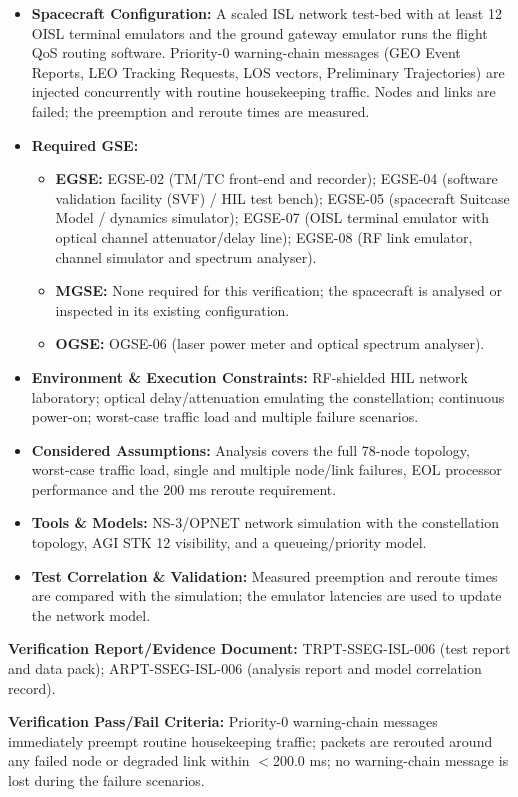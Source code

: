 \begin{itemize}
\item \textbf{Spacecraft Configuration:} A scaled ISL network test-bed with at least 12 OISL terminal emulators and the ground gateway emulator runs the flight QoS routing software. Priority-0 warning-chain messages (GEO Event Reports, LEO Tracking Requests, LOS vectors, Preliminary Trajectories) are injected concurrently with routine housekeeping traffic. Nodes and links are failed; the preemption and reroute times are measured.
\item \textbf{Required GSE:}
\begin{itemize}
\item \textbf{EGSE:} EGSE-02 (TM/TC front-end and recorder); EGSE-04 (software validation facility (SVF) / HIL test bench); EGSE-05 (spacecraft Suitcase Model / dynamics simulator); EGSE-07 (OISL terminal emulator with optical channel attenuator/delay line); EGSE-08 (RF link emulator, channel simulator and spectrum analyser).
\item \textbf{MGSE:} None required for this verification; the spacecraft is analysed or inspected in its existing configuration.
\item \textbf{OGSE:} OGSE-06 (laser power meter and optical spectrum analyser).
\end{itemize}
\item \textbf{Environment \& Execution Constraints:} RF-shielded HIL network laboratory; optical delay/attenuation emulating the constellation; continuous power-on; worst-case traffic load and multiple failure scenarios.
\item \textbf{Considered Assumptions:} Analysis covers the full 78-node topology, worst-case traffic load, single and multiple node/link failures, EOL processor performance and the 200 ms reroute requirement.
\item \textbf{Tools \& Models:} NS-3/OPNET network simulation with the constellation topology, AGI STK 12 visibility, and a queueing/priority model.
\item \textbf{Test Correlation \& Validation:} Measured preemption and reroute times are compared with the simulation; the emulator latencies are used to update the network model.
\end{itemize}
\par\textbf{Verification Report/Evidence Document:} TRPT-SSEG-ISL-006 (test report and data pack); ARPT-SSEG-ISL-006 (analysis report and model correlation record).
\par\textbf{Verification Pass/Fail Criteria:} Priority-0 warning-chain messages immediately preempt routine housekeeping traffic; packets are rerouted around any failed node or degraded link within $<$200.0 ms; no warning-chain message is lost during the failure scenarios.
\par\medskip
